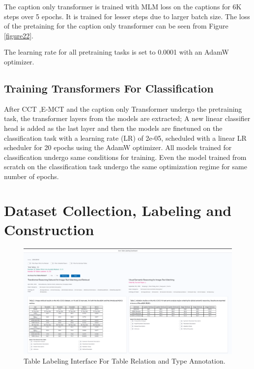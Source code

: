 The caption only transformer is trained with MLM loss on the captions for 6K steps over 5 epochs. It is trained for lesser steps due to larger batch size. The loss of the pretaining for the caption only transformer can be seen from Figure \ref{figure22}. 

The learning rate for all pretraining tasks is set to 0.0001 with an AdamW \parencite{loshchilov2017decoupled} optimizer. 

\subsection{Training Transformers For Classification}
\label{table_classification:models:class-task}
After CCT ,E-MCT and the caption only Transformer undergo the pretraining task, the transformer layers from the models are extracted; A new linear classifier head is added as the last layer and then the models are finetuned on the classification task with a learning rate (LR) of 2e-05, scheduled with a linear LR scheduler for 20 epochs using the AdamW optimizer. All models trained for classification undergo same conditions for training. Even the model trained from scratch on the classification task undergo the same optimization regime for same number of epochs.  

\section{Dataset Collection, Labeling and Construction}
\label{table_classification:data-coll}

\begin{figure}[h]
    \centering
    \includegraphics[width=\maxwidth{\textwidth}]{src/images/table-lable-exp.pdf}
    \caption{Table Labeling Interface For Table Relation and Type Annotation. }
    \label{figure\arabic{figurecounter}}
\end{figure}


